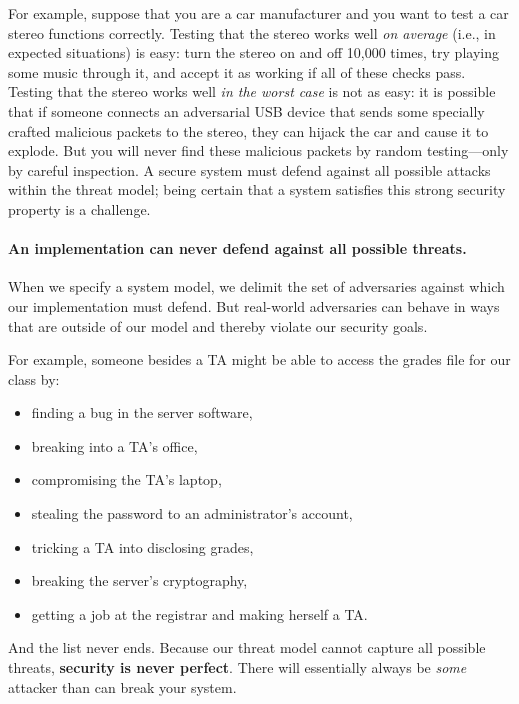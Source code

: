 For example, suppose that you are a car manufacturer and you
want to test a car stereo functions correctly.
Testing that the stereo  works well \emph{on average} (i.e., in expected situations)
is easy: turn the stereo on and off 10,000 times, try playing some music
through it, and accept it as working if all of these checks pass.
Testing that the stereo works well \emph{in the worst case} is not as
easy: it is possible that if someone connects an adversarial USB device that sends
some specially crafted malicious packets to the
stereo, they can hijack the car and cause it to explode. But you will never
find these malicious packets by random testing---only by careful 
inspection.
A secure system must defend against all possible attacks within the threat model;
being certain that a system satisfies this strong security property is a challenge.


\paragraph{An implementation can never defend against all possible threats.}
When we specify a system model, we delimit the set of adversaries 
against which our implementation must defend.
But real-world adversaries can behave in ways that are 
outside of our model and thereby violate our security goals.

For example, someone besides a TA might be able to
access the grades file for our class by:
\begin{itemize}
	\item finding a bug in the server software,
	\item breaking into a TA's office,
  \item compromising the TA's laptop,
	\item stealing the password to an administrator's account,
	\item tricking a TA into disclosing grades,
	\item breaking the server's cryptography,
	\item getting a job at the registrar and making herself a TA.
\end{itemize}

And the list never ends. Because our threat model cannot capture all
possible threats, \textbf{security is never perfect}.
There will essentially always be \textit{some} attacker than can break your system.

